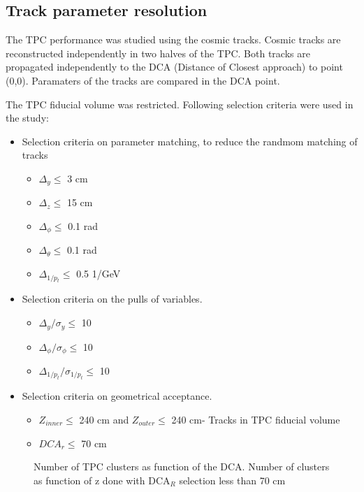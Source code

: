 \documentclass{elsart}
\begin{document}
\subsection{Track parameter resolution}


The TPC performance was studied using the cosmic tracks.
Cosmic tracks are reconstructed independently in two halves of the TPC. 
Both tracks are propagated independently to the DCA (Distance of Closest approach)  to point (0,0). Paramaters of the tracks are compared in the DCA point.


The TPC fiducial volume was restricted. Following selection criteria were used in the study:
\begin{itemize}
\item Selection criteria on parameter matching, to reduce the randmom matching of tracks
     \begin{itemize}
     \item $\Delta_{y} \leq$ 3  cm
     \item $\Delta_{z} \leq$ 15 cm
     \item $\Delta_{\phi}\leq$ 0.1 rad
     \item $\Delta_{\theta} \leq$ 0.1 rad
     \item $\Delta_{1/p_t} \leq$ 0.5 1/GeV		  
     \end{itemize} 
\item Selection criteria on the pulls of variables.
     \begin{itemize}
     \item $\Delta_{y}/\sigma_{y} \leq$ 10	
     \item $\Delta_{\phi}/\sigma_{\phi} \leq$ 10	
     \item $\Delta_{1/p_t}/\sigma_{1/p_t} \leq$ 10	
     \end{itemize}		 
\item Selection criteria on geometrical acceptance.
     \begin{itemize}
     \item $Z_{inner}\leq$ 240 cm and  $Z_{outer}\leq$ 240 cm- Tracks in TPC fiducial volume
     \item $DCA_r \leq$ 70 cm     		
     \end{itemize}	
\end{itemize}
 
\begin{figure}
  \centering{}
  \centering{}
  \caption{Number of TPC clusters as function of the DCA. 
   Number of clusters as function of z done with DCA$_R$ selection less than 70 cm}
  \label{figNCLDCA}
\end{figure}
\end{document}
